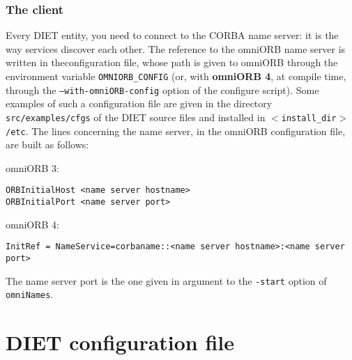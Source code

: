 \subsubsection{The client}

Every DIET entity, you need to connect to the CORBA name server: it is the
way services discover each other. The reference to the omniORB name
server is written in theconfiguration file, whose path is given to
omniORB through the environment variable \texttt{OMNIORB\_CONFIG} (or,
with \textbf{omniORB 4}, at compile time, through the
\texttt{--with-omniORB-config} option of the configure script). Some
examples of such a configuration file are given in the directory
\texttt{src/examples/cfgs} of the DIET source files and installed in
\texttt{$<$install\_dir$>$/etc}. The lines concerning the name server,
in the omniORB configuration file, are built as follows:
\begin{description}
 \item{omniORB 3:}
{\footnotesize
\begin{verbatim}
ORBInitialHost <name server hostname>
ORBInitialPort <name server port>
\end{verbatim}
}
 \item{omniORB 4:}
{\footnotesize
\begin{verbatim}
InitRef = NameService=corbaname::<name server hostname>:<name server port>
\end{verbatim}
}
The name server port is the one given in argument to the \texttt{-start} option
of \texttt{omniNames}.
\end{description}



\section{DIET configuration file} 

